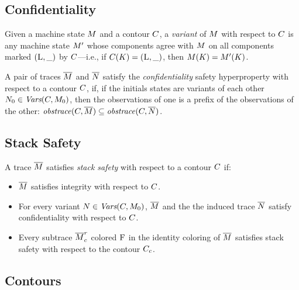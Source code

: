 \documentclass[conference]{IEEEtran}
\begin{document}

\subsection{Confidentiality}

Given a machine state $M$ and a contour $C$, a {\em
  variant} of $M$ with respect to $C$ is any machine state
$M'$ whose components agree with $M$ on all components marked
$(\textsc{L}, \_)$ by $C$---i.e., if $C(K) =
(\textsc{L}, \_)$, then $M(K) = M'(K)$.

A pair of traces $\overline{M}$ and $\overline{N}$ satisfy the {\em
  confidentiality} safety hyperproperty with respect to a contour
$C$, if, if the initials states are variants of each other $N_0
\in \textit{Vars}(C, M_0)$, then the observations of one is a prefix of the
observations of the other: $\mathit{obstrace}(C, \overline{M}) \subseteq
\mathit{obstrace}(C, \overline{N})$.


\subsection{Stack Safety}

A trace $\overline{M}$ satisfies {\em stack safety} with respect to a
contour $C$ if:
\begin{itemize}
\item $\overline{M}$ satisfies integrity with respect to $C$.
\item For every variant $N \in \textit{Vars}(C, M_0)$, $\overline{M}$
  and the the induced trace $\overline{N}$ satisfy confidentiality with
  respect to $C$.
\item Every subtrace $\overline{M}^r_c$ colored $\textsc{F}$ in the
  identity coloring of $\overline{M}$ satisfies stack safety with
  respect to the contour $C_c$.
\end{itemize}



\subsection{Contours}
\end{document}
